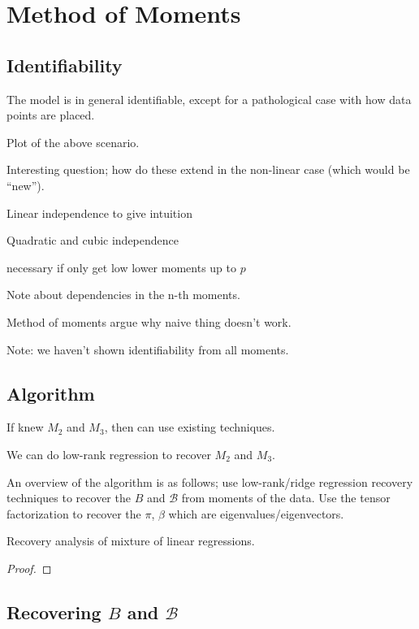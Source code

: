 \section{Method of Moments}
\label{sec:algo}

\subsection{Identifiability}

The model is in general identifiable, except for a pathological case
with how data points are placed.

Plot of the above scenario.

Interesting question; how do these extend in the non-linear case (which
would be ``new'').

Linear independence to give intuition

Quadratic and cubic independence

necessary if only get low lower moments up to $p$

Note about dependencies in the n-th moments. 

Method of moments
argue why naive thing doesn't work.

Note: we haven't shown identifiability from all moments.

\subsection{Algorithm}

If knew $M_2$ and $M_3$, then can use existing techniques.

We can do low-rank regression to recover $M_2$ and $M_3$.

An overview of the algorithm is as follows; use low-rank/ridge regression
recovery techniques to recover the $B$ and $\mathcal{B}$ from moments of the
data. Use the tensor factorization to recover the $\pi$, $\beta$ which are
eigenvalues/eigenvectors.


\begin{theorem}
  Recovery analysis of mixture of linear regressions.
\end{theorem}
\begin{proof}
\end{proof}

\subsection{Recovering $B$ and $\mathcal{B}$}

